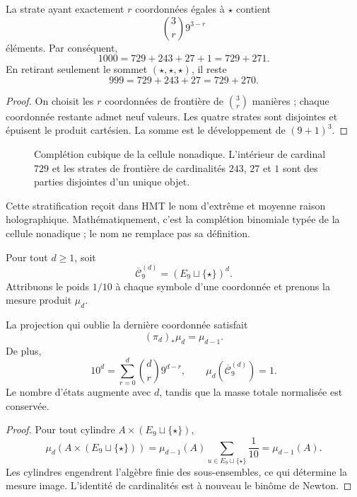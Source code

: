 \begin{theorem}
\label{p12-83-c1-s5:thm:emrh-binomial-autonoma}
La strate ayant exactement \(r\) coordonnées égales à \(\star\) contient
\[
 \binom3r9^{3-r}
\]
éléments. Par conséquent,
\[
 \boxed{1000=729+243+27+1=729+271.}
\]
En retirant seulement le sommet \((\star,\star,\star)\), il reste
\[
 999=729+243+27=729+270.
\]
\end{theorem}

\begin{proof}
On choisit les \(r\) coordonnées de frontière de \(\binom3r\) manières ; chaque
coordonnée restante admet neuf valeurs. Les quatre strates sont disjointes
et épuisent le produit cartésien. La somme est le développement de
\((9+1)^3\).
\end{proof}

\begin{figure}[htbp]
\centering
\resizebox{0.96\linewidth}{!}{}
\caption{Complétion cubique de la cellule nonadique. L’intérieur de
cardinal \(729\) et les strates de frontière de cardinalités \(243\), \(27\) et
\(1\) sont des parties disjointes d’un unique objet.}
\label{p12-83-c1-s5:fig:cubo-emrh-autonomo}
\end{figure}

Cette stratification reçoit dans HMT le nom d’extrême et moyenne raison
holographique. Mathématiquement, c’est la complétion binomiale typée de la cellule
nonadique ; le nom ne remplace pas sa définition.

Pour tout \(d\geq1\), soit
\[
 \overline{\mathcal C}^{(d)}_9=(E_9\sqcup\{\star\})^d.
\]
Attribuons le poids \(1/10\) à chaque symbole d’une coordonnée et prenons la mesure
produit \(\mu_d\).

\begin{theorem}
\label{p12-83-c1-s5:thm:medida-proyectiva-completacion}
La projection qui oublie la dernière coordonnée satisfait
\[
 (\pi_d)_*\mu_d=\mu_{d-1}.
\]
De plus,
\[
 10^d=\sum_{r=0}^{d}\binom dr9^{d-r},
 \qquad
 \mu_d(\overline{\mathcal C}^{(d)}_9)=1.
\]
Le nombre d’états augmente avec \(d\), tandis que la masse totale normalisée
est conservée.
\end{theorem}

\begin{proof}
Pour tout cylindre \(A\times(E_9\sqcup\{\star\})\),
\[
 \mu_d(A\times(E_9\sqcup\{\star\}))
 =\mu_{d-1}(A)\sum_{u\in E_9\sqcup\{\star\}}\frac1{10}
 =\mu_{d-1}(A).
\]
Les cylindres engendrent l’algèbre finie des sous-ensembles, ce qui détermine la
mesure image. L’identité de cardinalités est à nouveau le binôme de Newton.
\end{proof}

